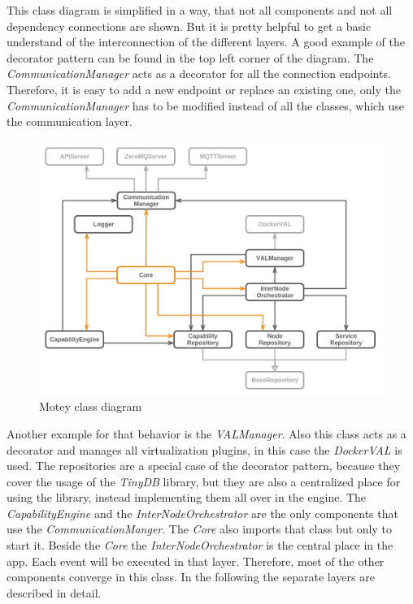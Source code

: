 This class diagram is simplified in a way, that not all components and not all dependency connections are shown.
But it is pretty helpful to get a basic understand of the interconnection of the different layers.
A good example of the decorator pattern can be found in the top left corner of the diagram.
The \textit{CommunicationManager} acts as a decorator for all the connection endpoints.
Therefore, it is easy to add a new endpoint or replace an existing one, only the \textit{CommunicationManager} has to be modified instead of all the classes, which use the communication layer.

\begin{figure}[H]
    \centering
    \includegraphics[width=\textwidth]{resources/images/class_diagram.png}
    \caption[Motey class diagram]{Motey class diagram}
    \label{fig:motey_class_diagram}
\end{figure}

Another example for that behavior is the \textit{VALManager}.
Also this class acts as a decorator and manages all virtualization plugins, in this case the \textit{DockerVAL} is used.
The repositories are a special case of the decorator pattern, because they cover the usage of the \textit{TinyDB} library, but they are also a centralized place for using the library, instead implementing them all over in the engine.
The \textit{CapabilityEngine} and the \textit{InterNodeOrchestrator} are the only components that use the \textit{CommunicationManger}.
The \textit{Core} also imports that class but only to start it.
Beside the \textit{Core} the \textit{InterNodeOrchestrator} is the central place in the app.
Each event will be executed in that layer.
Therefore, most of the other components converge in this class.
In the following the separate layers are described in detail.


